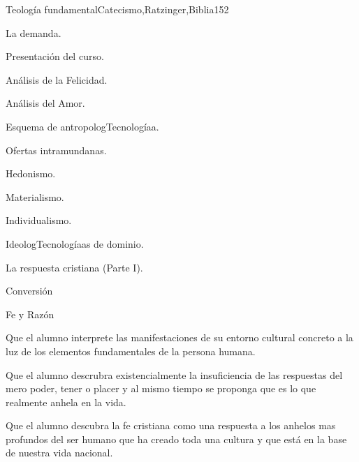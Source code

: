 \begin{syllabus}
\begin{unit}{Teología fundamental}{Catecismo,Ratzinger,Biblia}{15}{2}
\begin{topics}
	\item La demanda. 
	      \begin{inparaenum}
		    \item Presentación del curso.
		    \item Análisis de la Felicidad.
		    \item Análisis del Amor.
		    \item Esquema de antropologTecnologíaa.
	      \end{inparaenum}
	\item Ofertas intramundanas. 
	      \begin{inparaenum}
		    \item Hedonismo.
		    \item Materialismo.
		    \item Individualismo.
		    \item IdeologTecnologíaas de dominio.
	      \end{inparaenum}
	\item La respuesta cristiana (Parte I). 
	      \begin{inparaenum}
		    \item Conversión
		    \item Fe y Razón
	      \end{inparaenum}
\end{topics}
\begin{learningoutcomes}
	\item Que el alumno interprete las manifestaciones de su entorno cultural concreto a la luz de los elementos fundamentales de la persona humana.
	\item Que el alumno descrubra existencialmente la insuficiencia de las respuestas del mero poder, tener o placer y al mismo tiempo se proponga que es lo que realmente anhela en la vida.
	\item Que el alumno descubra la fe cristiana como una respuesta a los anhelos mas profundos del ser humano que ha creado toda una cultura y que está en la base de nuestra vida nacional.
\end{learningoutcomes}
\end{unit}


\end{syllabus}
